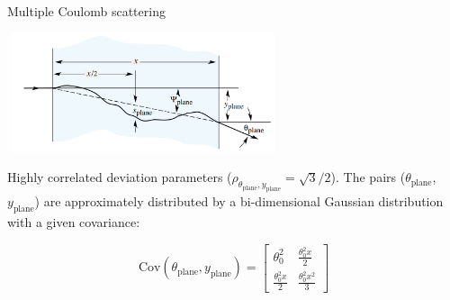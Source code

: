 \documentclass[8 pt]{beamer}
\begin{document}
\begin{frame}{Multiple Coulomb scattering}
\justifying
\begin{center}
\includegraphics[width=8cm, height=3.5cm]{figs/moliere.png}
\end{center} \vfill

Highly correlated deviation parameters ($\rho_{\theta_\text{plane}, y_\text{plane}}=\sqrt{3}/2$). The pairs ($\theta_\text{plane}$, $y_\text{plane}$) are approximately distributed by a bi-dimensional Gaussian distribution with a given covariance:

\begin{equation}
\text{Cov}(\theta_\text{plane}, y_\text{plane}) = \begin{bmatrix}
\theta^2_0 & \frac{\theta_0^2x}{2} \\
\frac{\theta_0^2x}{2} & \frac{\theta_0^2x^2}{3} 
\end{bmatrix}
\end{equation} \vfill
\end{frame}
\end{document}
